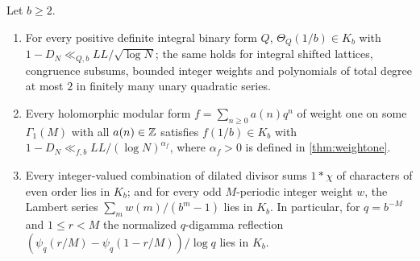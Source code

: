 \documentclass[11pt]{article}
\begin{document}
\begin{maintheorem}\label{thm:E}
Let $b\ge2$.
\begin{enumerate}[label=\textup{(\roman*)},nosep]
\item For every positive definite integral binary form $Q$,
$\Theta_Q(1/b)\in K_b$ with $1-D_N\ll_{Q,b}LL/\sqrt{\log N}$; the same holds for
integral shifted lattices, congruence subsums, bounded integer weights and
polynomials of total degree at most $2$ in finitely many unary quadratic
series.
\item Every holomorphic modular form $f=\sum_{n\ge0}a(n)q^n$ of weight one on some
$\Gamma_1(M)$ with all $a(n)\in\mathbb Z$ satisfies $f(1/b)\in K_b$ with
$1-D_N\ll_{f,b}LL/(\log N)^{\alpha_f}$, where $\alpha_f>0$ is defined in
\cref{thm:weightone}.
\item Every integer-valued combination of dilated divisor sums $1*\chi$ of
characters of even order lies in $K_b$; and for every odd $M$-periodic integer
weight $w$, the Lambert series $\sum_mw(m)/(b^m-1)$ lies in $K_b$. In particular,
for $q=b^{-M}$ and $1\le r<M$ the normalized $q$-digamma reflection
$(\psi_q(r/M)-\psi_q(1-r/M))/\log q$ lies in $K_b$.
\end{enumerate}
\end{maintheorem}
\end{document}
